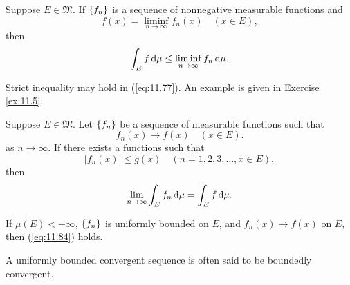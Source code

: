 \begin{thm}
    \label{thm:11.31}
    Suppose $E \in \mathfrak{M}$.
    If $\protect\{f_n\}$ is a sequence of nonnegative measurable functions and
    \begin{equation*}
        f(x) = \liminf_{n \rightarrow \infty} f_n (x)
        \quad (x \in E),
    \end{equation*}
    then
    \begin{equation}
        \label{eq:11.77}
        \int_E f \d \mu \leq
        \liminf _{n \rightarrow \infty} f_n \d \mu .
    \end{equation}
\end{thm}

Strict inequality may hold in (\ref{eq:11.77}).
An example is given in Exercise \ref{ex:11.5}.

\begin{thm}
    \label{thm:11.32}
    Suppose $E \in \mathfrak{M}$.
    Let $\protect\{f_n\}$ be a sequence of measurable functions such that
    \begin{equation}
        \label{eq:11.82}
        f_n(x) \rightarrow f(x)
        \quad (x \in E).
    \end{equation}
    as $n \rightarrow \infty$.
    If there exists a functions such that
    \begin{equation}
        \label{eq:11.83}
        \left| f_n(x) \right| \leq g(x)
        \quad (n = 1,2,3,\dots,x \in E),
    \end{equation}
    then
    \begin{equation}
        \label{eq:11.84}
        \lim_{n \to \infty} \int_E f_n \d \mu =
        \int_E f \d \mu .
    \end{equation}
\end{thm}

\begin{myCorollary*}
    If $\mu(E) < +\infty$, $\protect\{f_n\}$ is uniformly bounded on $E$, and $f_n(x) \rightarrow f(x)$ on $E$, then (\ref{eq:11.84}) holds.
\end{myCorollary*}

A uniformly bounded convergent sequence is often said to be boundedly
convergent.